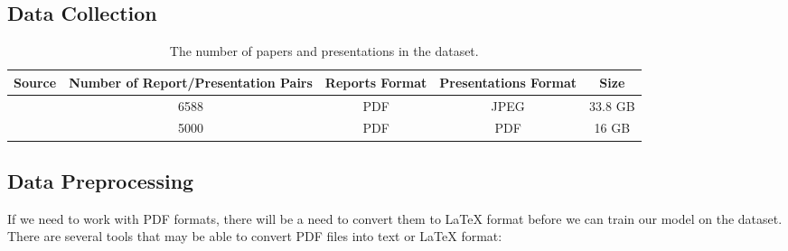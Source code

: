 \subsection{Data Collection}
\begin{table}
    \centering
    \begin{tabulary}{\linewidth}{c|C|C|C|c}
        \hline
        \textbf{Source} & \textbf{Number of Report/Presentation Pairs} & \textbf{Reports Format} & \textbf{Presentations Format} & \textbf{Size} \\
        \hline
        \citet{Fu:2022:AAAI} & 6588 & PDF & JPEG & 33.8 GB \\
        \citet{Sefid:2019:K-CAP} & 5000 & PDF & PDF & 16 GB \\
        \hline
    \end{tabulary}
    \caption{The number of papers and presentations in the dataset.}
    \label{tab:dataset}
\end{table}
\subsection{Data Preprocessing}
If we need to work with PDF formats, there will be a need to convert them to \LaTeX{} format before we can train our model on the dataset. There are several tools that may be able to convert PDF files into text or \LaTeX{} format: 

